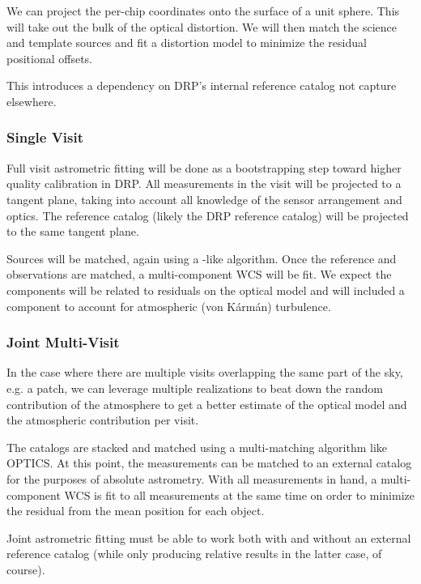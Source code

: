 We can project the per-chip coordinates onto the surface of a unit sphere.
This will take out the bulk of the optical distortion.
We will then match the science and template sources and fit a distortion model to minimize the residual positional offsets.

\begin{note}[Dependency]
This introduces a dependency on DRP's internal reference catalog not capture elsewhere.
\end{note}

\subsubsection{Single Visit}
\label{sec:acSingleVisitAstrometricFit}
Full visit astrometric fitting will be done as a bootstrapping step toward higher quality calibration in DRP.  All measurements in the visit will be projected to a tangent plane, taking into account all knowledge of the sensor arrangement and optics.  The reference catalog (likely the DRP reference catalog) will be projected to the same tangent plane.

Sources will be matched, again using a \cite{2007PASA...24..189T}-like algorithm.  Once the reference and observations are matched, a multi-component WCS will be fit.  We expect the components will be related to residuals on the optical model and will included a component to account for atmospheric (von K\'{a}rm\'{a}n) turbulence.

\subsubsection{Joint Multi-Visit}
\label{sec:acJointAstrometricFit}
In the case where there are multiple visits overlapping the same part of the sky, e.g. a patch, we can leverage multiple realizations to beat down the random contribution of the atmosphere to get a better estimate of the optical model and the atmospheric contribution per visit.

The catalogs are stacked and matched using a multi-matching algorithm like OPTICS.  At this point, the measurements can be matched to an external catalog for the purposes of absolute astrometry.  With all measurements in hand, a multi-component WCS is fit to all measurements at the same time on order to minimize the residual from the mean position for each object.

Joint astrometric fitting must be able to work both with and without an external reference catalog (while only producing relative results in the latter case, of course).

